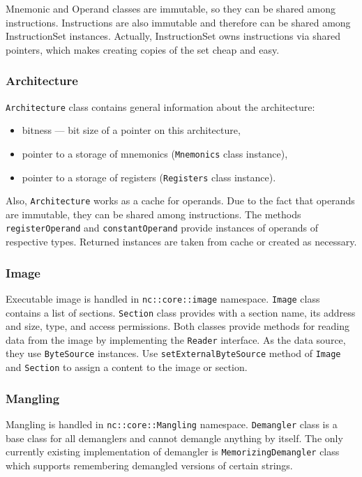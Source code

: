 \documentclass[a4paper,12pt]{article}
\newcommand{\ident}[1]{\texttt{#1}}
\begin{document}
Mnemonic and Operand classes are immutable, so they can be shared among instructions.
Instructions are also immutable and therefore can be shared among InstructionSet instances.
Actually, InstructionSet owns instructions via shared pointers, which makes creating copies of the set cheap and easy.

\subsubsection{Architecture}

\ident{Architecture} class contains general information about the architecture:
\begin{itemize}
\item bitness --- bit size of a pointer on this architecture,
\item pointer to a storage of mnemonics (\ident{Mnemonics} class instance),
\item pointer to a storage of registers (\ident{Registers} class instance).
\end{itemize}

Also, \ident{Architecture} works as a cache for operands.
Due to the fact that operands are immutable, they can be shared among instructions.
The methods \ident{registerOperand} and \ident{constantOperand} provide instances of operands of respective types.
Returned instances are taken from cache or created as necessary.

\subsubsection{Image}

Executable image is handled in \ident{nc::core::image} namespace.
\ident{Image} class contains a list of sections.
\ident{Section} class provides with a section name, its address and size, type, and access permissions.
Both classes provide methods for reading data from the image by implementing the \ident{Reader} interface.
As the data source, they use \ident{ByteSource} instances.
Use \ident{setExternalByteSource} method of \ident{Image} and \ident{Section} to assign a content to the image or section.

\subsubsection{Mangling}
Mangling is handled in \ident{nc::core::Mangling} namespace.
\ident{Demangler} class is a base class for all demanglers and cannot demangle anything by itself.
The only currently existing implementation of demangler is \ident{MemorizingDemangler} class which supports remembering demangled versions of certain strings.
\end{document}
